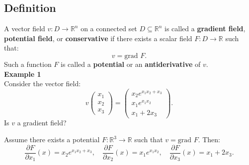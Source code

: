 \documentclass{article}
\begin{document}
\subsection*{Definition}
A vector field \( v: D \rightarrow \mathbb{R}^n \) on a connected set \( D \subseteq \mathbb{R}^n \) is called a \textbf{gradient field}, \textbf{potential field}, or \textbf{conservative} if there exists a scalar field \( F: D \rightarrow \mathbb{R} \) such that:
\[
v = \text{grad } F.
\]
Such a function \( F \) is called a \textbf{potential} or an \textbf{antiderivative} of \( v \).
\\
\textbf{Example 1}\\
Consider the vector field:
\[
v \begin{pmatrix} x_1 \\ x_2 \\ x_3 \end{pmatrix} = 
\begin{pmatrix} 
x_2 e^{x_1 x_2 + x_3} \\ 
x_1 e^{x_1 x_2} \\ 
x_1 + 2 x_3 
\end{pmatrix}.
\]
Is \( v \) a gradient field?

Assume there exists a potential \( F: \mathbb{R}^3 \rightarrow \mathbb{R} \) such that \( v = \text{grad } F \). Then:
\[
\frac{\partial F}{\partial x_1}(x) = x_2 e^{x_1 x_2 + x_3}, \quad
\frac{\partial F}{\partial x_2}(x) = x_1 e^{x_1 x_2}, \quad
\frac{\partial F}{\partial x_3}(x) = x_1 + 2 x_3.
\]
\end{document}
